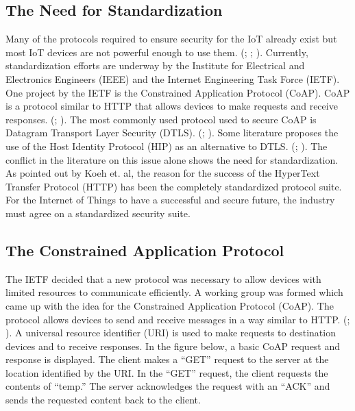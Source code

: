 \documentclass[letterpaper, 12pt]{article}
\begin{document}
\begin{flushleft}
\subsection*{The Need for Standardization}
Many of the protocols required to ensure security for the IoT already exist but most IoT devices are not powerful enough to use them. (\cite{Keoh6817545}; \cite{Granjal7005393}; \cite{Garcia-Morchon:2013:SII:2462096.2462117}). Currently, standardization efforts are underway by the
Institute for Electrical and Electronics Engineers (IEEE) and the Internet Engineering Task Force (IETF). One project by the IETF is the
Constrained Application Protocol (CoAP). CoAP is a protocol similar to HTTP that allows devices to make requests and receive responses. 
(\cite{Keoh6817545}; \cite{Capossele}). The most commonly used protocol used to secure CoAP is Datagram Transport Layer Security (DTLS). (\cite{Keoh6817545}; \cite{Garcia-Morchon:2013:SII:2462096.2462117}). 
Some literature proposes the use of the Host Identity Protocol (HIP) as an alternative to DTLS. (\cite{Hummen}; \cite{Garcia-Morchon:2013:SII:2462096.2462117}). The conflict in the literature on this issue alone shows the need for standardization. As pointed out by Koeh et. al, the reason for the success of the HyperText Transfer Protocol (HTTP) has been the completely standardized protocol suite. For the Internet
of Things to have a successful and secure future, the industry must agree on a standardized security suite.

\subsection*{The Constrained Application Protocol}
The IETF decided that a new protocol was necessary to allow devices with limited resources to communicate efficiently. A working group was formed which came up 
with the idea for the Constrained Application Protocol (CoAP). The protocol allows devices to send and receive messages
in a way similar to HTTP. (\cite{Keoh6817545}; \cite{Capossele}). A universal resource identifier (URI) is used to make requests to destination devices and to
receive responses. In the figure below, a basic CoAP request and response is displayed. The client makes a ``GET'' request to the server at the location identified by the URI. In the ``GET'' request, the client requests the contents of ``temp.'' The server acknowledges the request with an ``ACK'' and sends the requested content back to the client. 


\end{flushleft}
\end{document}

